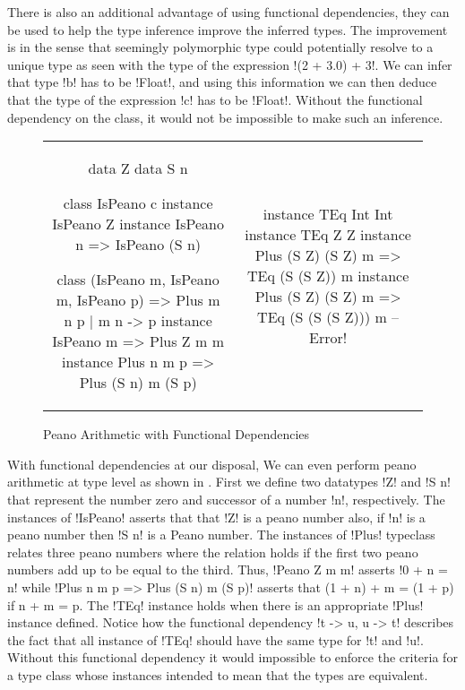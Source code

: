 \documentclass[format=sigplan,manuscript,review,screen, nonacm]{acmart}
\begin{document}
There is also an additional advantage of using functional dependencies, they
can be used to help the type inference improve
the inferred types. The improvement is in the sense that seemingly polymorphic type
could potentially resolve to a unique type as seen with
the type of the expression !(2 + 3.0) + 3!. We can infer
that type !b! has to be !Float!, and using this information we can
then deduce that the type of the expression !c! has to be !Float!.
Without the functional dependency on the class, it would not be impossible
to make such an inference.

\begin{figure}[ht]
  \begin{tabular}{c c}
    \begin{code}
      data Z
      data S n

      class IsPeano c
      instance IsPeano Z
      instance IsPeano n => IsPeano (S n)

      class (IsPeano m, IsPeano m, IsPeano p)
          => Plus m n p | m n -> p
      instance IsPeano m => Plus Z m m
      instance Plus n m p => Plus (S n) m (S p)
      \end{code}&%
      \begin{code}
      instance TEq Int Int
      instance TEq Z Z
      instance Plus (S Z) (S Z) m
          => TEq (S (S Z)) m
      instance Plus (S Z) (S Z) m
          => TEq (S (S (S Z))) m -- Error!
    \end{code}
  \end{tabular}
  \caption{Peano Arithmetic with Functional Dependencies}
  \label{fig:peano-arith}
\end{figure}
With functional dependencies at our disposal, We can even perform peano arithmetic at type level as shown in .
First we define two datatypes !Z! and !S n! that represent the number zero and successor of a number !n!,
respectively. The instances of !IsPeano! asserts that that !Z! is a peano number also, if !n! is a peano number
then !S n! is a Peano number. The instances of !Plus! typeclass relates three peano numbers where the relation
holds if the first two peano numbers add up to be equal to the third. Thus, !Peano Z m m! asserts
!0 + n = n! while !Plus n m p => Plus (S n) m (S p)! asserts that (1 + n) + m = (1 + p) if n + m = p.
The !TEq! instance holds when there is an appropriate !Plus! instance defined. Notice how the functional dependency
!t -> u, u -> t! describes the fact that all instance of !TEq! should have the same type for !t! and !u!. Without this
functional dependency it would impossible to enforce the criteria for a type class whose instances intended to mean
that the types are equivalent.
\end{document}
